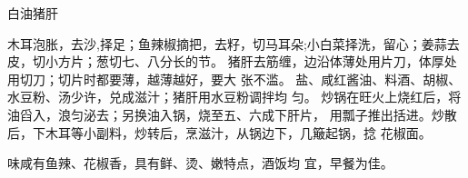 \begin{recipe}{白油猪肝}

\ingredients


\cooking

\step 木耳泡胀，去沙,择足；鱼辣椒摘把，去籽，切马耳朵;小白菜择洗，留心；姜蒜去
皮，切小方片；葱切七、八分长的节。
\step 猪肝去筋缠，边沿体薄处用片刀，体厚处用切刀；切片时都要薄，越薄越好，要大
张不滥。
\step 盐、咸红酱油、料酒、胡椒、水豆粉、汤少许，兑成滋汁；猪肝用水豆粉调拌均
匀。
\step 炒锅在旺火上烧红后，将油舀入，浪匀泌去；另换油入锅，烧至五、六成下肝片，
用瓢子推出括进。炒散后，下木耳等小副料，炒转后，烹滋汁，从锅边下，几簸起锅，捻
花椒面。

\notes

味咸有鱼辣、花椒香，具有鲜、烫、嫩特点，酒饭均 宜，早餐为佳。

\end{recipe}


